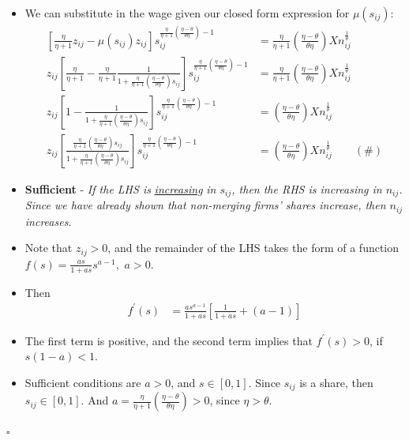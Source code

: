 \documentclass[12pt]{article}
\theoremstyle{prop}
\begin{document}
\begin{itemize}
\begin{align*}
	\end{align*}
	\item We can substitute in the wage given our closed form expression for
	$\mu\left(s_{ij}\right)$:
	\begin{align*}
		\left[\frac{\eta}{\eta+1}z_{ij}-\mu\left(s_{ij}\right)z_{ij}\right]s_{ij}^{\frac{\eta}{\eta+1}\left(\frac{\eta-\theta}{\theta\eta}\right)-1} & =\frac{\eta}{\eta+1}\left(\frac{\eta-\theta}{\theta\eta}\right)Xn_{ij}^{\frac{1}{\theta}}\\
		z_{ij}\left[\frac{\eta}{\eta+1}-\frac{\eta}{\eta+1}\frac{1}{1+\frac{\eta}{\eta+1}\left(\frac{\eta-\theta}{\theta\eta}\right)s_{ij}}\right]s_{ij}^{\frac{\eta}{\eta+1}\left(\frac{\eta-\theta}{\theta\eta}\right)-1} & =\frac{\eta}{\eta+1}\left(\frac{\eta-\theta}{\theta\eta}\right)Xn_{ij}^{\frac{1}{\theta}}\\
		z_{ij}\left[1-\frac{1}{1+\frac{\eta}{\eta+1}\left(\frac{\eta-\theta}{\theta\eta}\right)s_{ij}}\right]s_{ij}^{\frac{\eta}{\eta+1}\left(\frac{\eta-\theta}{\theta\eta}\right)-1} & =\left(\frac{\eta-\theta}{\theta\eta}\right)Xn_{ij}^{\frac{1}{\theta}}\\
		z_{ij}\left[\frac{\frac{\eta}{\eta+1}\left(\frac{\eta-\theta}{\theta\eta}\right)s_{ij}}{1+\frac{\eta}{\eta+1}\left(\frac{\eta-\theta}{\theta\eta}\right)s_{ij}}\right]s_{ij}^{\frac{\eta}{\eta+1}\left(\frac{\eta-\theta}{\theta\eta}\right)-1} & =\left(\frac{\eta-\theta}{\theta\eta}\right)Xn_{ij}^{\frac{1}{\theta}}\qquad\left(\#\right)
	\end{align*}
	\item \textbf{Sufficient }- \emph{If the LHS is }\emph{\uline{increasing}}
	\emph{in $s_{ij}$, then the RHS is increasing in $n_{ij}$. Since
		we have already shown that non-merging firms' shares increase, then
		$n_{ij}$ increases.}
	\item Note that $z_{ij}>0$, and the remainder of the LHS takes the form
	of a function $f\left(s\right)=\frac{as}{1+as}s^{a-1},$ $a>0$.
	\item Then
	\begin{align*}
		f^{\prime}\left(s\right) & =\frac{as^{a-1}}{1+as}\left[\frac{1}{1+as}+\left(a-1\right)\right]
	\end{align*}
	\item The first term is positive, and the second term implies that $f^{\prime}\left(s\right)>0$,
	if $s\left(1-a\right)<1.$
	\item Sufficient conditions are $a>0$, and $s\in\left[0,1\right]$. Since
	$s_{ij}$ is a share, then $s_{ij}\in\left[0,1\right]$. And $a=\frac{\eta}{\eta+1}\left(\frac{\eta-\theta}{\theta\eta}\right)>0$,
	since $\eta>\theta$.
\end{itemize}
 \begin{flushright}
      $\square$
 \end{flushright}
\clearpage 
\end{document}
